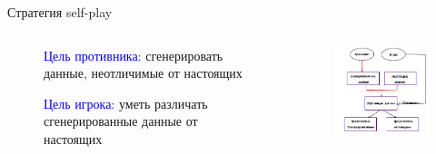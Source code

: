 \documentclass{beamer}
\begin{document}
\begin{frame}{Стратегия self-play}
    \begin{columns}[]
        \begin{column}{.4\textwidth}
            \begin{figure}
                \begin{flushleft}
                    \textcolor{blue}{Цель противника: }
                    сгенерировать данные, неотличимые от настоящих
                \end{flushleft}
                
            \end{figure}
            \begin{figure}
                \begin{flushleft}
                    \textcolor{blue}{Цель игрока:} 
                    уметь различать сгенерированные данные от настоящих
                \end{flushleft}
            \end{figure}
        \end{column}
        \begin{column}{.6\textwidth}
            \begin{figure}
                \includegraphics[width=6cm]{self-play.pdf}
            \end{figure}
        \end{column}
    \end{columns}

    
\end{frame}
\end{document}
